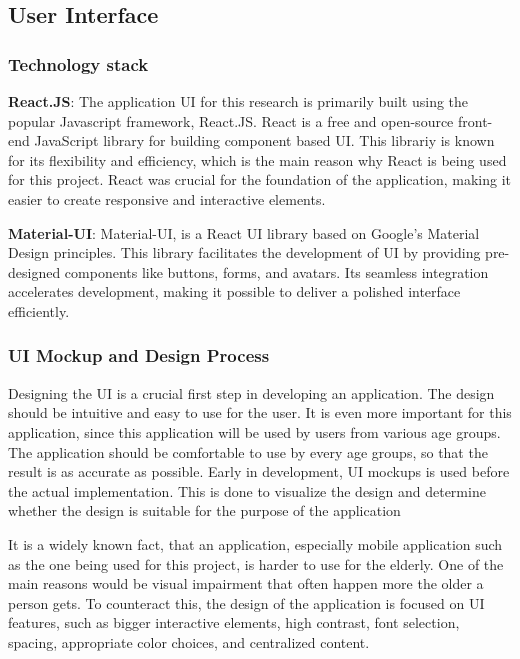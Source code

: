 \subsection{User Interface}

\subsubsection{Technology stack}

\textbf{React.JS}: The application \ac{UI} for this research is primarily built using the popular Javascript framework, React.JS.
React is a free and open-source front-end JavaScript library for building component based \ac{UI}.
This librariy is known for its flexibility and efficiency, which is the main reason why React is being used for this project.
React was crucial for the foundation of the application, making it easier to create responsive and interactive elements.  

\textbf{ Material-UI}: Material-UI, is a React UI library based on Google’s Material Design principles.
This library facilitates the development of \ac{UI} by providing pre-designed components like buttons, forms, and avatars. 
Its seamless integration accelerates development, making it possible  to deliver a polished interface efficiently.

\subsubsection{UI Mockup and Design Process}

Designing the \ac{UI} is a crucial first step in developing an application.
The design should be intuitive and easy to use for the user.
It is even more important for this application, since this application will be used by users from various age groups.
The application should be comfortable to use by every age groups, so that the result is as accurate as possible.
Early in development, \ac{UI} mockups is used before the actual implementation.
This is done to visualize the design and determine whether the design is suitable for the purpose of the application

It is a widely known fact, that an application, especially mobile application such as the one being used for this project, is harder to use for the elderly.
One of the main reasons would be visual impairment that often happen more the older a person gets.
To counteract this, the design of the application is focused on \ac{UI} features, such as bigger interactive elements, high contrast, font selection, spacing, appropriate color choices, and  centralized content.

